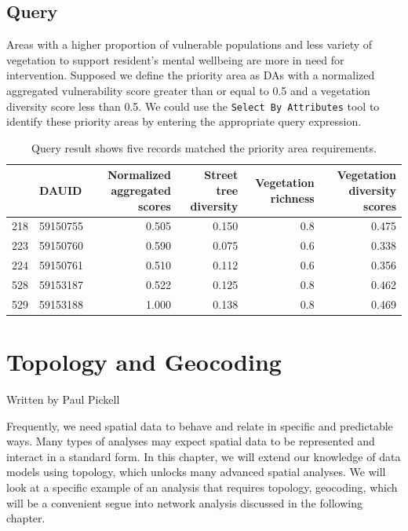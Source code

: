 \documentclass[
]{book}
\begin{document}
\section{Query}\label{query}

Areas with a higher proportion of vulnerable populations and less variety of vegetation to support resident's mental wellbeing are more in need for intervention. Supposed we define the priority area as DAs with a normalized aggregated vulnerability score greater than or equal to 0.5 and a vegetation diversity score less than 0.5. We could use the \texttt{Select\ By\ Attributes} tool to identify these priority areas by entering the appropriate query expression.

\begin{table}

\caption{\label{tab:5-case-study-9}Query result shows five records matched the priority area requirements.}
\centering
\begin{tabular}[t]{llrrrr}
\toprule
  & DAUID & Normalized aggregated scores & Street tree diversity & Vegetation richness & Vegetation diversity scores\\
\midrule
218 & 59150755 & 0.505 & 0.150 & 0.8 & 0.475\\
223 & 59150760 & 0.590 & 0.075 & 0.6 & 0.338\\
224 & 59150761 & 0.510 & 0.112 & 0.6 & 0.356\\
528 & 59153187 & 0.522 & 0.125 & 0.8 & 0.462\\
529 & 59153188 & 1.000 & 0.138 & 0.8 & 0.469\\
\bottomrule
\end{tabular}
\end{table}

\chapter{Topology and Geocoding}\label{topology-and-geocoding}

Written by
Paul Pickell

Frequently, we need spatial data to behave and relate in specific and predictable ways. Many types of analyses may expect spatial data to be represented and interact in a standard form. In this chapter, we will extend our knowledge of data models using topology, which unlocks many advanced spatial analyses. We will look at a specific example of an analysis that requires topology, geocoding, which will be a convenient segue into network analysis discussed in the following chapter.
\end{document}
